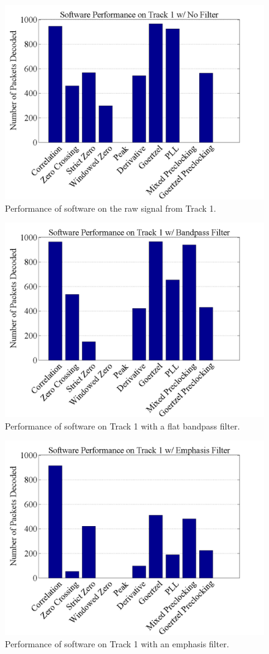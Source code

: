 \begin{figure}
  \centering
	\includegraphics[width=0.75\linewidth]{images/SoftwarePerformanceonTrack1wNoFilter.png} 
	\caption{Performance of software on the raw signal from Track 1.}
   \label{T1FiltNo}
\end{figure}
\begin{figure}
  \centering
	\includegraphics[width=0.75\linewidth]{images/SoftwarePerformanceonTrack1wBandpassFilter.png} 
	\caption{Performance of software on Track 1 with a flat bandpass filter.}
   \label{T1Filt0}
\end{figure}
\begin{figure}
  \centering
	\includegraphics[width=0.75\linewidth]{images/SoftwarePerformanceonTrack1wEmphasisFilter.png} 
	\caption{Performance of software on Track 1 with an emphasis filter.}
   \label{T1Filt6}
\end{figure}

